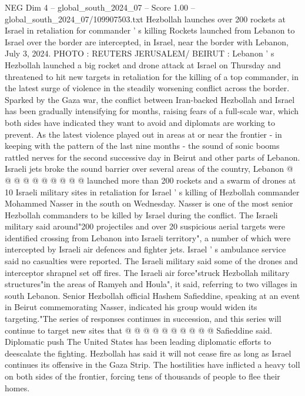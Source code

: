 \begin{textsample}{NEG Dim 4 – global\_south\_2024\_07 – Score 1.00 – global\_south\_2024\_07/109907503.txt}  \label{ex:f4_neg_350}
Hezbollah launches over 200 rockets at Israel in retaliation for commander ' s killing Rockets launched from Lebanon to Israel over the border are intercepted, in Israel, near the border with Lebanon, July 3, 2024.
PHOTO : REUTERS JERUSALEM/ BEIRUT : Lebanon ' s Hezbollah launched a big rocket and drone attack at Israel on Thursday and threatened to hit new targets in retaliation for the killing of a top commander, in the latest surge of violence in the steadily worsening conflict across the border.
Sparked by the Gaza war, the conflict between Iran-backed Hezbollah and Israel has been gradually intensifying for months, raising fears of a full-scale war, which both sides have indicated they want to avoid and diplomats are working to prevent.
As the latest violence played out in areas at or near the frontier - in keeping with the pattern of the last nine months - the sound of sonic booms rattled nerves for the second successive day in Beirut and other parts of Lebanon.
Israeli jets broke the sound barrier over several areas of the country, Lebanon @ @ @ @ @ @ @ @ @ @ launched more than 200 rockets and a swarm of drones at 10 Israeli military sites in retaliation for Israel ' s killing of Hezbollah commander Mohammed Nasser in the south on Wednesday.
Nasser is one of the most senior Hezbollah commanders to be killed by Israel during the conflict.
The Israeli military said around"200 projectiles and over 20 suspicious aerial targets were identified crossing from Lebanon into Israeli territory", a number of which were intercepted by Israeli air defences and fighter jets.
Israel ' s ambulance service said no casualties were reported.
The Israeli military said some of the drones and interceptor shrapnel set off fires.
The Israeli air force"struck Hezbollah military structures"in the areas of Ramyeh and Houla", it said, referring to two villages in south Lebanon.
Senior Hezbollah official Hashem Safieddine, speaking at an event in Beirut commemorating Nasser, indicated his group would widen its targeting."The series of responses continues in succession, and this series will continue to target new sites that @ @ @ @ @ @ @ @ @ @ Safieddine said.
Diplomatic push The United States has been leading diplomatic efforts to deescalate the fighting.
Hezbollah has said it will not cease fire as long as Israel continues its offensive in the Gaza Strip.
The hostilities have inflicted a heavy toll on both sides of the frontier, forcing tens of thousands of people to flee their homes.

\end{textsample}
